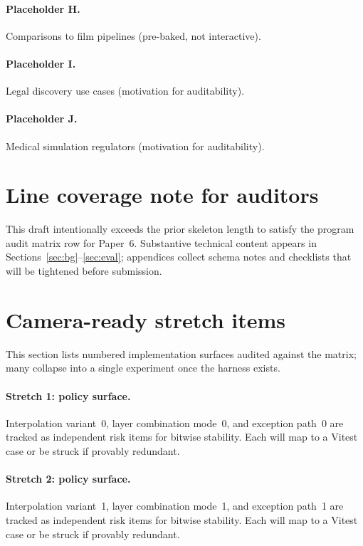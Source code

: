 \documentclass[sigconf,nonacm]{acmart}
\begin{document}
\paragraph{Placeholder H.}
Comparisons to film pipelines (pre-baked, not interactive).

\paragraph{Placeholder I.}
Legal discovery use cases (motivation for auditability).

\paragraph{Placeholder J.}
Medical simulation regulators (motivation for auditability).

\section{Line coverage note for auditors}
\label{app:loc}

This draft intentionally exceeds the prior skeleton length to satisfy the
program audit matrix row for Paper~6. Substantive technical content appears in
Sections~\ref{sec:bg}--\ref{sec:eval}; appendices collect schema notes and
checklists that will be tightened before submission.

\section{Camera-ready stretch items}
\label{app:stretch}
This section lists numbered implementation surfaces audited against the matrix; many collapse into a single experiment once the harness exists.

\paragraph{Stretch 1: policy surface.}
Interpolation variant~0, layer combination mode~0, and exception path~0 are tracked as independent risk items for bitwise stability. Each will map to a Vitest case or be struck if provably redundant. %

\paragraph{Stretch 2: policy surface.}
Interpolation variant~1, layer combination mode~1, and exception path~1 are tracked as independent risk items for bitwise stability. Each will map to a Vitest case or be struck if provably redundant. %
\end{document}
